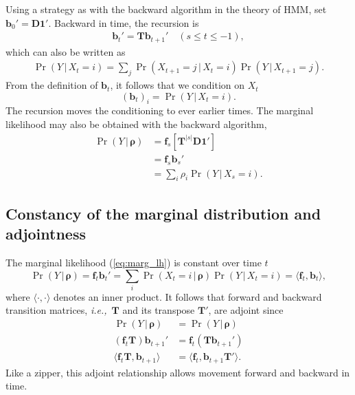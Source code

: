 \documentclass[preprint]{elsarticle}
\newcommand{\bs}[1]{\ensuremath{\boldsymbol{#1}}}
\newcommand\given{{\,|\,}}
\newcommand\ie{{\it i.e.,}}
\newcommand\x[1]{\ensuremath{X_{#1}}}
\newcommand\y{\ensuremath{Y}}
\newcommand\s{\ensuremath{s}}
\newcommand\fv[1]{\ensuremath{\mathbf{f}_{#1}}}
\newcommand\bv[1]{\ensuremath{\mathbf{b}_{#1}}}
\newcommand\oneC{\ensuremath{\mathbf{1}'}}
\begin{document}
Using a strategy as with the backward algorithm in the theory of HMM, set $\bv{0}'=\mathbf{D}\oneC$. Backward in time, the recursion is
\begin{equation}
\begin{split}
\bv{t}' = \mathbf{T} \bv{t+1}' \quad (\s \le t \le -1),
\end{split}
\end{equation}
which can also be written as
\begin{equation}\label{eq:backwards_discrete}
\begin{split}
\Pr(\y \given \x{t}=i) = \sum_j \Pr(\x{t+1}=j \given \x{t}=i) \Pr(\y \given \x{t+1}=j).
\end{split}
\end{equation}
From the definition of $\bv{t}$, it follows that we condition on $\x{t}$
\begin{equation}
(\bv{t})_{i} = \Pr(\y \given \x{t}=i).
\end{equation}
The recursion moves the conditioning to ever earlier times. The marginal likelihood may also be obtained with the backward algorithm,
\begin{equation}\label{eq:marg_lh}
\begin{split}
\Pr(\y \given \bs{\rho}) &= \fv{\s} \left[\mathbf{T}^{|\s|} \mathbf{D}\oneC\right]\\
                         &= \fv{\s} \bv{\s}' \\
                         &= \sum_i \rho_i \Pr(\y \given \x{\s}=i).
\end{split}
\end{equation}

\subsection{Constancy of the marginal distribution and adjointness}

The marginal likelihood (\ref{eq:marg_lh}) is constant over time $t$ 
\begin{equation}
\Pr(\y \given \bs{\rho}) = \fv{t}\bv{t}' =\sum_i \Pr(\x{t}=i \given \bs{\rho}) \Pr(\y \given \x{t}=i) = \langle \fv{t}, \bv{t} \rangle,
\end{equation}
where $\langle \cdot , \cdot \rangle$ denotes an inner product.  It follows that forward and backward transition matrices, \ie\ $\mathbf{T}$ and its transpose $\mathbf{T}'$, are adjoint since
\begin{equation}\label{eq:adjoint_discrete}
\begin{split}
\Pr(\y \given \bs{\rho})              &= \Pr(\y \given \bs{\rho}) \\
(\fv{t}\mathbf{T})\bv{t+1}' &= \fv{t} (\mathbf{T}\bv{t+1}') \\
\langle \fv{t}\mathbf{T},\bv{t+1} \rangle   &= \langle  \fv{t},\bv{t+1}\mathbf{T}' \rangle.
\end{split}
\end{equation}
Like a zipper, this adjoint relationship allows movement forward and backward in time.
\end{document}

